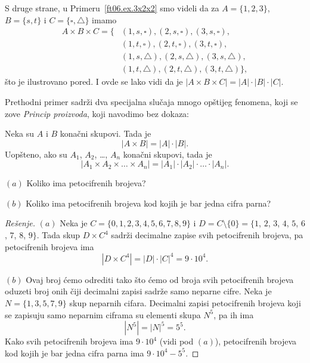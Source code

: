 \smallskip

\noindent
\begin{minipage}{3in}
  \hspace*{1.5em}S druge strane, u Primeru~\ref{ft06.ex.3x2x2} smo videli da za
  $A = \{1, 2, 3\}$, $B = \{s, t\}$ i $C = \{\square, \triangle\}$ imamo
  \begin{align*}
  A \times B \times C = \{ &(1,s,\square), (2,s,\square), (3,s,\square), \\
                           &(1,t,\square), (2,t,\square), (3,t,\square), \\
                           &(1,s,\triangle), (2,s,\triangle), (3,s,\triangle),\\
                           &(1,t,\triangle), (2,t,\triangle), (3,t,\triangle)\},
  \end{align*}
  \v sto je ilustrovano pored. I ovde se lako vidi da je $|A \times B \times C| = |A| \cdot |B| \cdot |C|$.
\end{minipage}
\hfill
\begin{minipage}{2.5in}
  \begin{center}
    
  \end{center}
\end{minipage}

\bigskip

Prethodni primer sadr\v zi dva specijalna slu\v caja mnogo op\v stijeg fenomena, koji se zove \emph{Princip proizvoda},
koji navodimo bez dokaza:

\begin{THM} Neka su $A$ i $B$ kona\v cni skupovi. Tada je
  $$
    |A \times B| = |A| \cdot |B|.
  $$
  Uop\v steno, ako su $A_1$, $A_2$, \ldots, $A_n$ kona\v cni skupovi, tada je
  $$
    |A_1 \times A_2 \times \ldots \times A_n| = |A_1| \cdot |A_2| \cdot \ldots \cdot |A_n|.
  $$
\end{THM}

\begin{EX}
  $(a)$ Koliko ima petocifrenih brojeva?
  
  $(b)$ Koliko ima petocifrenih brojeva kod kojih je bar jedna cifra parna?
\end{EX}
\begin{proof}[Re\v senje]
  $(a)$ Neka je $C = \{0, 1, 2, 3, 4, 5, 6, 7, 8, 9\}$ i $D = C \setminus \{0\} = \{1$, $2$, $3$, $4$, $5$, $6$, $7$, $8$, $9\}$.
  Tada skup $D \times C^4$ sadr\v zi decimalne zapise svih petocifrenih brojeva, pa petocifrenih brojeva ima
  $$
    |D \times C^4| = |D| \cdot |C|^4 = 9 \cdot 10^4.
  $$
  
  \medskip
  
  $(b)$ Ovaj broj \'cemo odrediti tako \v sto \'cemo od broja svih petocifrenih brojeva oduzeti broj onih \v ciji decimalni
  zapisi sadr\v ze samo neparne cifre. Neka je $N = \{1, 3, 5, 7, 9\}$ skup neparnih cifara. Decimalni zapisi
  petocifrenih brojeva koji se zapisuju samo neparnim ciframa su elementi skupa $N^5$, pa ih ima
  $$
    |N^5| = |N|^5 = 5^5.
  $$
  Kako svih petocifrenih brojeva ima $9 \cdot 10^4$ (vidi pod $(a)$), petocifrenih brojeva kod kojih je bar jedna cifra parna ima
  $9 \cdot 10^4 - 5^5$.
\end{proof}

